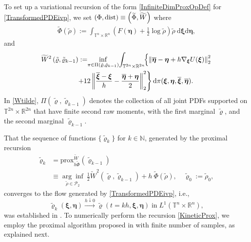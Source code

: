 \documentclass[10pt,twocolumn]{IEEEtran}
\begin{document}
To set up a variational recursion of the form \eqref{InfiniteDimProxOpDef} for \eqref{TransformedPDEivp}, we set $(\Phi,{\rm{dist}}) \equiv \left(\widetilde{\Phi},\widetilde{W}\right)$ where
\begin{align}
\widetilde{\Phi}(\tilde{\rho}) := \int_{\mathbb{T}^{n} \times \mathbb{R}^{n}}\left(F(\boldsymbol{\eta})+\frac{1}{2} \log \tilde{\rho}\right) \tilde{\rho}\: \mathrm{d} \boldsymbol{\xi} \mathrm{d} \boldsymbol{\eta},
\label{Phitilde}	
\end{align}
and 
\begin{align}
\widetilde{W}^{2}\left(\tilde{\varrho}, \tilde{\varrho}_{k-1}\right):=\!&\inf _{\pi \in \Pi\left(\tilde{\varrho}, \tilde{\varrho}_{k-1}\right)}\!\int_{\mathbb{T}^{2 n} \times \mathbb{R}^{2 n}}\!\!\left\{\left\|\overline{\boldsymbol{\eta}}-\boldsymbol{\eta}+h \nabla_{\boldsymbol{\xi}} U(\boldsymbol{\xi})\right\|_{2}^{2}\right.\nonumber\\
&\hspace*{-0.2in}\left.+12\left\|\frac{\overline{\boldsymbol{\xi}}-\boldsymbol{\xi}}{h}-\frac{\overline{\boldsymbol{\eta}}+\boldsymbol{\eta}}{2}\right\|_{2}^{2}\right\} \mathrm{d} \pi(\boldsymbol{\xi}, \boldsymbol{\eta}, \overline{\boldsymbol{\xi}}, \overline{\boldsymbol{\eta}}).
\label{Wtilde}	
\end{align}
In \eqref{Wtilde}, $\Pi\left(\tilde{\varrho}, \tilde{\varrho}_{k-1}\right)$ denotes the collection of all joint PDFs supported on $\mathbb{T}^{2 n} \times \mathbb{R}^{2 n}$ that have finite second raw moments, with the first marginal $\tilde{\varrho}$, and the second marginal $\tilde{\varrho}_{k-1}$.

That the sequence of functions $\{\tilde{\varrho}_{k}\}$ for $k\in\mathbb{N}$, generated by the proximal recursion
\begin{align}
\tilde{\varrho}_{k} &= {\text{prox}}^{\widetilde{W}}_{h\widetilde{\Phi}}(\tilde{\varrho}_{k-1}) \nonumber\\
&\equiv \underset{\tilde{\rho}\in\mathcal{P}_{2}}{\arg\inf}\:\frac{1}{2}\widetilde{W}^{2}\left(\tilde{\varrho},\tilde{\varrho}_{k-1}\right) + h\:\widetilde{\Phi}(\tilde{\rho}), \quad \tilde{\varrho}_{0} := \tilde{\rho}_{0},
\label{KineticProx}	
\end{align}
converges to the flow generated by \eqref{TransformedPDEivp}, i.e., 
$$\tilde{\varrho}_{k}(\bm{\xi},\bm{\eta}) \xrightarrow{h\downarrow 0} \tilde{\varrho}(t=kh,\bm{\xi},\bm{\eta})\;\text{in}\;L^{1}\left(\mathbb{T}^{n}\times\mathbb{R}^{n}\right),$$
was established in \cite{duong2014conservative}. To numerically perform the recursion \eqref{KineticProx}, we employ the proximal algorithm proposed in \cite{caluya2019TAC} with finite number of samples, as explained next.
\end{document}
